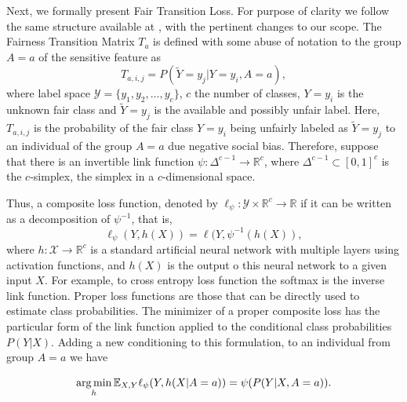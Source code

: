 Next, we formally present Fair Transition Loss. For purpose of clarity we follow the same structure available at \citep{Patrini2017}, with the pertinent changes to our scope. The Fairness Transition Matrix $T_a$ is defined with some abuse of notation to the group $A=a$ of the sensitive feature as 
\begin{equation}
    T_{a,i,j} = P(\tilde{Y} = y_j|Y = y_i, A=a),
\end{equation}
where label space $\mathcal{Y} = \{y_1, y_2, \ldots, y_c\}$, $c$ the number of classes, $Y=y_i$ is the unknown fair class and $\tilde{Y}=y_j$ is the available and possibly unfair label. Here, $T_{a,i,j}$ is the probability of the fair class $Y=y_i$ being unfairly labeled as $\tilde{Y}=y_j$ to an individual of the group $A=a$ due negative social bias. Therefore, suppose that there is an invertible link function $\psi : \Delta^{c-1} \rightarrow \mathbb{R}^c$, where $\Delta^{c-1} \subset [0,1]^c$ is the $c$-simplex, the simplex in a $c$-dimensional space. 

Thus, a composite loss function, denoted by $\ell_{\psi} : \mathcal{Y} \times \mathbb{R}^c \rightarrow \mathbb{R}$ if it can be written as a decomposition of $\psi^{-1}$, that is,
\begin{equation}
    \ell_{\psi}(Y, h(X)) = \ell(Y, \psi^{-1}(h(X)), 
\end{equation}
where $h:\mathcal{X} \rightarrow \mathbb{R}^c$ is a standard artificial neural network with multiple layers using activation functions, and $h(X)$ is the output o this neural network to a given input $X$. For example, to cross entropy loss function the softmax is the inverse link function. Proper loss functions are those that can be directly used to estimate class probabilities. The minimizer of a proper composite loss has the particular form of the link function applied to the conditional class probabilities $P(Y|X)$. Adding a new conditioning to this formulation, to an individual from group $A=a$ we have

\begin{equation} \label{eq:argmin_ftl}
    \operatorname*{arg\,min}\limits_{h}\mathbb{E}_{X,Y}\ell_{\psi}(Y, h(X|A=a)) = \psi(P(Y|X,A=a)).
\end{equation}

